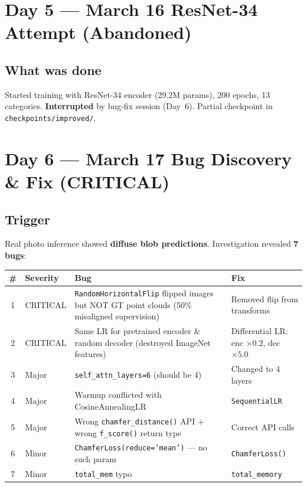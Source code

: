 \documentclass[10pt,a4paper]{article}
\begin{document}
\section*{Day 5 --- March 16 \hfill \normalfont\small ResNet-34 Attempt (Abandoned)}

\subsection*{What was done}
Started training with ResNet-34 encoder (29.2M params), 200 epochs, 13 categories. \textbf{Interrupted} by bug-fix session (Day~6). Partial checkpoint in \texttt{checkpoints/improved/}.

\section*{Day 6 --- March 17 \hfill \normalfont\small\textcolor{fail}{Bug Discovery \& Fix (CRITICAL)}}

\subsection*{Trigger}
Real photo inference showed \textbf{diffuse blob predictions}. Investigation revealed \textbf{7 bugs}:

\begin{center}
\small
\begin{tabular}{clp{5.5cm}p{4.5cm}}
\toprule
\textbf{\#} & \textbf{Severity} & \textbf{Bug} & \textbf{Fix} \\
\midrule
1 & CRITICAL & \texttt{RandomHorizontalFlip} flipped images but NOT GT point clouds (50\% misaligned supervision) & Removed flip from transforms \\
2 & CRITICAL & Same LR for pretrained encoder \& random decoder (destroyed ImageNet features) & Differential LR: enc $\times0.2$, dec $\times5.0$ \\
3 & Major & \texttt{self\_attn\_layers=6} (should be 4) & Changed to 4 layers \\
4 & Major & Warmup conflicted with CosineAnnealingLR & \texttt{SequentialLR} \\
5 & Major & Wrong \texttt{chamfer\_distance()} API + wrong \texttt{f\_score()} return type & Correct API calls \\
6 & Minor & \texttt{ChamferLoss(reduce='mean')} --- no such param & \texttt{ChamferLoss()} \\
7 & Minor & \texttt{total\_mem} typo & \texttt{total\_memory} \\
\bottomrule
\end{tabular}
\end{center}
\end{document}
